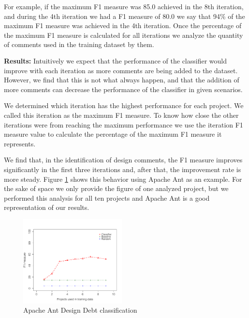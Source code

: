 For example, if the maximum F1 measure was 85.0 achieved in the 8th iteration, and during the 4th iteration we had a F1 measure of 80.0 we say that 94\% of the maximum F1 measure was achieved in the 4th iteration. Once the percentage of the maximum F1 measure is calculated for all iterations we analyze the quantity of comments used in the training dataset by them. 

\vspace{1mm}
\noindent \textbf{Results:} Intuitively we expect that the performance of the classifier would improve with each iteration as more comments are being added to the dataset. However, we find that this is not what always happen, and that the addition of more comments can decrease the performance of the classifier in given scenarios.

We determined which iteration has the highest performance for each project. We called this iteration as the maximum F1 measure. To know how close the other iterations were from reaching the maximum performance we use the iteration F1 measure value to calculate the percentage of the maximum F1 measure it represents.

We find that, in the identification of design \SATD comments, the F1 measure improves significantly in the first three iterations and, after that, the improvement rate is more steady. Figure \ref{fig:design_ant_result} shows this behavior using Apache Ant as an example. For the sake of space we only provide the figure of one analyzed project, but we performed this analysis for all ten projects and Apache Ant is a good representation of our results. 


\begin{figure}[thb!]
  \centering
  \includegraphics[width = 0.48\textwidth]{figures/design_ant.pdf}
  \vspace{-3mm}
  \caption{Apache Ant Design Debt classification}
  \label{fig:design_ant_result}
\end{figure}

